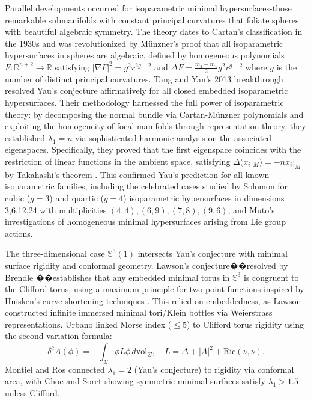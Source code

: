 \documentclass[a4, 12pt]{amsart}
\numberwithin{equation}{section} \numberwithin{equation}{section}
\begin{document}
Parallel developments occurred for isoparametric minimal hypersurfaces-those remarkable submanifolds with constant principal curvatures that foliate spheres with beautiful algebraic symmetry. The theory dates to Cartan's classification in the 1930s and was revolutionized by M\"{u}nzner's proof \cite{Mun1,Mun2}that all isoparametric hypersurfaces in spheres are algebraic, defined by homogeneous polynomials $F: \mathbb{R}^{n+2} \to \mathbb{R}$ satisfying $|\nabla F|^2 = g^2 r^{2g-2}$ and $\Delta F = \frac{m_2-m_1}{2}g^2 r^{g-2}$ where $g$ is the number of distinct principal curvatures. Tang and Yan's 2013 breakthrough \cite{TY1} resolved Yau's conjecture affirmatively for all closed embedded isoparametric hypersurfaces. Their methodology harnessed the full power of isoparametric theory: by decomposing the normal bundle via Cartan-M\"{u}nzner polynomials and exploiting the homogeneity of focal manifolds through representation theory, they established $\lambda_1 = n$ via sophisticated harmonic analysis on the associated eigenspaces. Specifically, they proved that the first eigenspace coincides with the restriction of linear functions in the ambient space, satisfying $\Delta(x_i|_M) = -n x_i|_M$ by Takahashi's theorem \cite{Tak}. This confirmed Yau's prediction for all known isoparametric families, including the celebrated cases studied by Solomon \cite{Sol1,Sol2,Sol3} for cubic ($g=3$) and quartic ($g=4$) isoparametric hypersurfaces in dimensions 3,6,12,24 with multiplicities $(4,4),(6,9),(7,8),(9,6)$, and Muto's investigations \cite{Mut1,Mut2} of homogeneous minimal hypersurfaces arising from Lie group actions.


The three-dimensional case $\mathbb{S}^3(1)$ intersects Yau's conjecture with minimal surface rigidity and conformal geometry. Lawson's conjecture��resolved by Brendle \cite{Br1}��establishes that any embedded minimal torus in $\mathbb{S}^3$ is congruent to the Clifford torus, using a maximum principle for two-point functions inspired by Huisken's curve-shortening techniques \cite{Hui}. This relied on embeddedness, as Lawson \cite{Law2} constructed infinite immersed minimal tori/Klein bottles via Weierstrass representations. Urbano \cite{Urb} linked Morse index ($\leq 5$) to Clifford torus rigidity using the second variation formula:
\begin{equation*}
\delta^2 A(\phi) = -\int_\Sigma \phi L\phi \, d\mathrm{vol}_\Sigma, \quad L = \Delta + |A|^2 + \text{Ric}(\nu,\nu).
\end{equation*}
Montiel and Ros \cite{MR} connected $\lambda_1 = 2$ (Yau's conjecture) to rigidity via conformal area, with Choe and Soret \cite{CS} showing symmetric minimal surfaces satisfy $\lambda_1 > 1.5$ unless Clifford.
\end{document}
